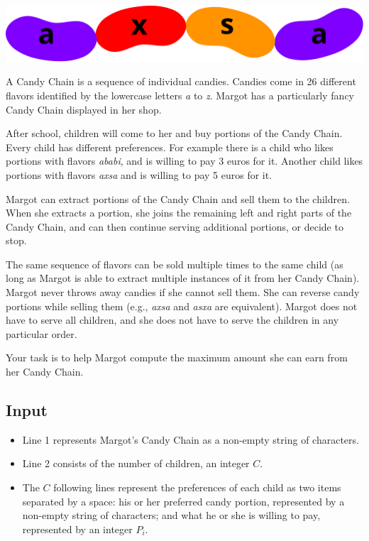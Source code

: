 
{\centering
  \includegraphics[width=.6\linewidth]{jellybeans-together}
\par}

\medskip

\noindent
A Candy Chain is a sequence of individual candies. Candies come in 26
different flavors identified by the lowercase letters \emph{a} to
\emph{z}. Margot has a particularly fancy Candy Chain displayed in her shop.

After school, children will come to her and buy portions of the Candy
Chain. Every child has different preferences.  For example there is a
child who likes portions with flavors \emph{ababi}, and is willing to pay
3 euros for it. Another child likes portions with flavors \emph{axsa} and
is willing to pay 5 euros for it.

Margot can extract portions of the Candy Chain and sell them to the
children. When she extracts a portion, she joins the remaining left
and right parts of the Candy Chain, and can then continue serving
additional portions, or decide to stop.

The same sequence of flavors can be sold multiple times to the same
child (as long as Margot is able to extract multiple instances of it from
her Candy Chain). Margot never throws away candies if she cannot sell
them. She can reverse candy portions while selling them (e.g., \emph{axsa}
and \emph{asxa} are equivalent). Margot does not have to serve all
children, and she does not have to serve the children in any particular
order.

Your task is to help Margot compute the maximum amount she can earn
from her Candy Chain.

\subsection*{Input}

\begin{itemize}

  \item Line 1 represents Margot's Candy Chain as a non-empty string of
    characters.

  \item Line 2 consists of the number of children, an integer $C$.

  \item The $C$ following lines represent the preferences of each child
    as two items separated by a space:
    his or her preferred candy portion,
    represented by a non-empty string of characters; and what he or she is willing to pay,
    represented by an integer $P_i$.
\end{itemize}

